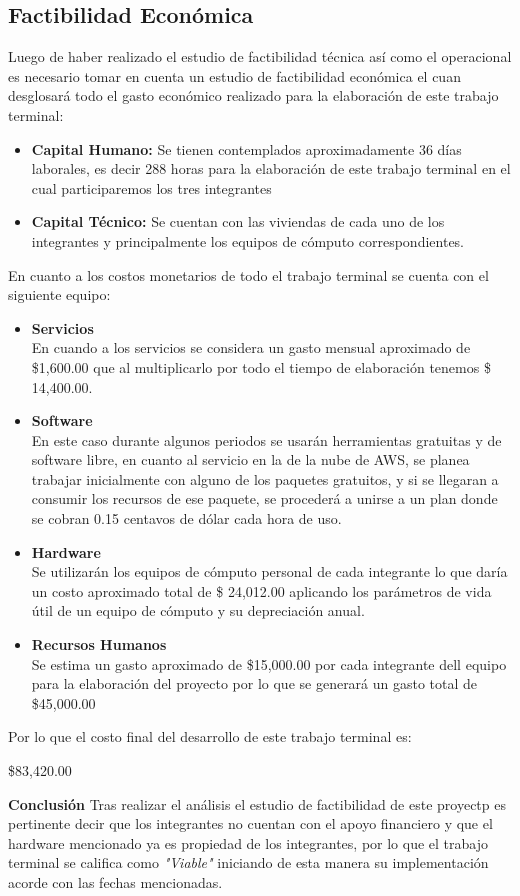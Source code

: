 \documentclass[12pt, a4paper, titlepage]{report}
\begin{document}
    	\subsection{Factibilidad Económica}
    	Luego de haber realizado el estudio de factibilidad técnica así como el operacional es necesario tomar en cuenta un estudio de factibilidad económica el cuan desglosará todo el gasto económico realizado para la elaboración de este trabajo terminal:
    	\begin{itemize}
    		\item \textbf{Capital Humano:} Se tienen contemplados aproximadamente 36 días laborales, es decir 288 horas para la elaboración de este trabajo terminal en el cual participaremos los tres integrantes
    		\item \textbf{Capital Técnico:} Se cuentan con las viviendas de cada uno de los integrantes y principalmente los equipos de cómputo correspondientes.
    	\end{itemize}
    	En cuanto a los costos monetarios de todo el trabajo terminal se cuenta con el siguiente equipo:
    	\begin{itemize}
    		\item \textbf{Servicios}\\
    		En cuando a los servicios se considera un gasto mensual aproximado de \$1,600.00 que al multiplicarlo por todo el tiempo de elaboración tenemos \$ 14,400.00.
    		\item \textbf{Software} \\
    		En este caso durante algunos periodos se usarán herramientas gratuitas y de software libre, en cuanto al servicio en la de la nube de AWS, se planea trabajar inicialmente con alguno de los paquetes gratuitos, y si se llegaran a consumir los recursos de ese paquete, se procederá a unirse a un plan donde se cobran 0.15 centavos de dólar cada hora de uso.
    		\item \textbf{Hardware}\\
    		Se utilizarán los equipos de cómputo personal de cada integrante lo que daría un costo aproximado total de \$ 24,012.00 aplicando los parámetros de vida útil de un equipo de cómputo y su depreciación anual. 
    		\item \textbf{Recursos Humanos}\\
    		Se estima un gasto aproximado de \$15,000.00 por cada integrante dell equipo para la elaboración del proyecto por lo que se generará un gasto total de \$45,000.00
    	\end{itemize}
    	Por lo que el costo final del desarrollo de este trabajo terminal es: \\
    	\begin{center}
    		\$83,420.00
    	\end{center}
    	\textbf{Conclusión} 
    	Tras realizar el análisis el estudio de factibilidad de este proyectp es pertinente decir que los integrantes no cuentan con el apoyo financiero y que el hardware mencionado ya es propiedad de los integrantes, por lo que el trabajo terminal se califica como \textit{"Viable"} iniciando de esta manera su implementación acorde con las fechas mencionadas.
    	    
\end{document}

